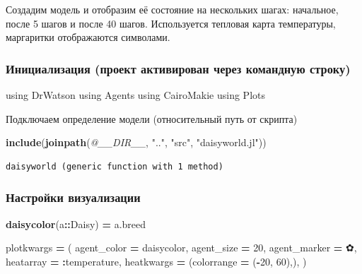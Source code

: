 \documentclass[
  english,
  russian,
  12pt,
  a4paper,
  DIV=11,
  numbers=noendperiod]{scrreprt}
\newenvironment{Shaded}{\begin{snugshade}}{\end{snugshade}}
\newcommand{\BuiltInTok}[1]{#1}
\newcommand{\CharTok}[1]{\textcolor[rgb]{0.31,0.60,0.02}{#1}}
\newcommand{\DataTypeTok}[1]{\textcolor[rgb]{0.13,0.29,0.53}{#1}}
\newcommand{\FloatTok}[1]{\textcolor[rgb]{0.00,0.00,0.81}{#1}}
\newcommand{\FunctionTok}[1]{\textcolor[rgb]{0.13,0.29,0.53}{\textbf{#1}}}
\newcommand{\ImportTok}[1]{#1}
\newcommand{\NormalTok}[1]{#1}
\newcommand{\OperatorTok}[1]{\textcolor[rgb]{0.81,0.36,0.00}{\textbf{#1}}}
\newcommand{\PreprocessorTok}[1]{\textcolor[rgb]{0.56,0.35,0.01}{\textit{#1}}}
\newcommand{\StringTok}[1]{\textcolor[rgb]{0.31,0.60,0.02}{#1}}
\begin{document}
Создадим модель и отобразим её состояние на нескольких шагах: начальное,
после 5 шагов и после 40 шагов. Используется тепловая карта температуры,
маргаритки отображаются символами.

\subsubsection{Инициализация (проект активирован через командную
строку)}\label{ux438ux43dux438ux446ux438ux430ux43bux438ux437ux430ux446ux438ux44f-ux43fux440ux43eux435ux43aux442-ux430ux43aux442ux438ux432ux438ux440ux43eux432ux430ux43d-ux447ux435ux440ux435ux437-ux43aux43eux43cux430ux43dux434ux43dux443ux44e-ux441ux442ux440ux43eux43aux443}

\begin{Shaded}
\begin{Highlighting}[]
\ImportTok{using} \BuiltInTok{DrWatson}
\ImportTok{using} \BuiltInTok{Agents}
\ImportTok{using} \BuiltInTok{CairoMakie}
\ImportTok{using} \BuiltInTok{Plots}
\end{Highlighting}
\end{Shaded}

Подключаем определение модели (относительный путь от скрипта)

\begin{Shaded}
\begin{Highlighting}[]
\FunctionTok{include}\NormalTok{(}\FunctionTok{joinpath}\NormalTok{(}\PreprocessorTok{@\_\_DIR\_\_}\NormalTok{, }\StringTok{".."}\NormalTok{, }\StringTok{"src"}\NormalTok{, }\StringTok{"daisyworld.jl"}\NormalTok{))}
\end{Highlighting}
\end{Shaded}

\begin{verbatim}
daisyworld (generic function with 1 method)
\end{verbatim}

\subsubsection{Настройки
визуализации}\label{ux43dux430ux441ux442ux440ux43eux439ux43aux438-ux432ux438ux437ux443ux430ux43bux438ux437ux430ux446ux438ux438}

\begin{Shaded}
\begin{Highlighting}[]
\FunctionTok{daisycolor}\NormalTok{(a}\OperatorTok{::}\DataTypeTok{Daisy}\NormalTok{) }\OperatorTok{=}\NormalTok{ a.breed}

\NormalTok{plotkwargs }\OperatorTok{=}\NormalTok{ (}
\NormalTok{    agent\_color }\OperatorTok{=}\NormalTok{ daisycolor,}
\NormalTok{    agent\_size }\OperatorTok{=} \FloatTok{20}\NormalTok{,}
\NormalTok{    agent\_marker }\OperatorTok{=} \CharTok{\textquotesingle{}✿\textquotesingle{}}\NormalTok{,}
\NormalTok{    heatarray }\OperatorTok{=} \OperatorTok{:}\NormalTok{temperature,}
\NormalTok{    heatkwargs }\OperatorTok{=}\NormalTok{ (colorrange }\OperatorTok{=}\NormalTok{ (}\OperatorTok{{-}}\FloatTok{20}\NormalTok{, }\FloatTok{60}\NormalTok{),),}
\NormalTok{)}
\end{Highlighting}
\end{Shaded}
\end{document}

